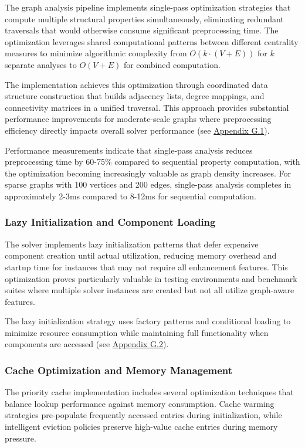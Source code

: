 The graph analysis pipeline implements single-pass optimization strategies that compute multiple structural properties simultaneously, eliminating redundant traversals that would otherwise consume significant preprocessing time. The optimization leverages shared computational patterns between different centrality measures to minimize algorithmic complexity from $O(k \cdot (V+E))$ for $k$ separate analyses to $O(V+E)$ for combined computation.

The implementation achieves this optimization through coordinated data structure construction that builds adjacency lists, degree mappings, and connectivity matrices in a unified traversal. This approach provides substantial performance improvements for moderate-scale graphs where preprocessing efficiency directly impacts overall solver performance (see \hyperref[appendix:single-pass-analysis]{Appendix G.1}).

Performance measurements indicate that single-pass analysis reduces preprocessing time by 60-75\% compared to sequential property computation, with the optimization becoming increasingly valuable as graph density increases. For sparse graphs with 100 vertices and 200 edges, single-pass analysis completes in approximately 2-3ms compared to 8-12ms for sequential computation.

\subsubsection{Lazy Initialization and Component Loading}

The solver implements lazy initialization patterns that defer expensive component creation until actual utilization, reducing memory overhead and startup time for instances that may not require all enhancement features. This optimization proves particularly valuable in testing environments and benchmark suites where multiple solver instances are created but not all utilize graph-aware features.

The lazy initialization strategy uses factory patterns and conditional loading to minimize resource consumption while maintaining full functionality when components are accessed (see \hyperref[appendix:lazy-initialization]{Appendix G.2}).

\subsubsection{Cache Optimization and Memory Management}

The priority cache implementation includes several optimization techniques that balance lookup performance against memory consumption. Cache warming strategies pre-populate frequently accessed entries during initialization, while intelligent eviction policies preserve high-value cache entries during memory pressure.

